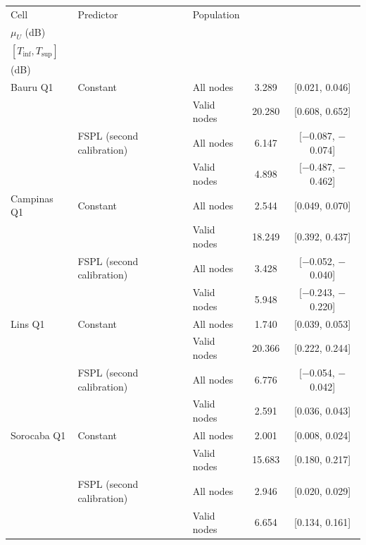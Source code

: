\begin{tabular}{lllcc}
\toprule
Cell & Predictor & Population & \celula{Domain mean \\ \relax $\mu_U$ (dB)} & \celula{Design term \\ \relax $[T_{\inf}, T_{\sup}]$ \\ \relax (dB)} \\
\midrule
Bauru Q1 & Constant & All nodes & 3.289 & [0.021, 0.046] \\
 &  & Valid nodes & 20.280 & [0.608, 0.652] \\
 & FSPL (second calibration) & All nodes & 6.147 & [$-$0.087, $-$0.074] \\
 &  & Valid nodes & 4.898 & [$-$0.487, $-$0.462] \\
\midrule
Campinas Q1 & Constant & All nodes & 2.544 & [0.049, 0.070] \\
 &  & Valid nodes & 18.249 & [0.392, 0.437] \\
 & FSPL (second calibration) & All nodes & 3.428 & [$-$0.052, $-$0.040] \\
 &  & Valid nodes & 5.948 & [$-$0.243, $-$0.220] \\
\midrule
Lins Q1 & Constant & All nodes & 1.740 & [0.039, 0.053] \\
 &  & Valid nodes & 20.366 & [0.222, 0.244] \\
 & FSPL (second calibration) & All nodes & 6.776 & [$-$0.054, $-$0.042] \\
 &  & Valid nodes & 2.591 & [0.036, 0.043] \\
\midrule
Sorocaba Q1 & Constant & All nodes & 2.001 & [0.008, 0.024] \\
 &  & Valid nodes & 15.683 & [0.180, 0.217] \\
 & FSPL (second calibration) & All nodes & 2.946 & [0.020, 0.029] \\
 &  & Valid nodes & 6.654 & [0.134, 0.161] \\
\bottomrule
\end{tabular}
